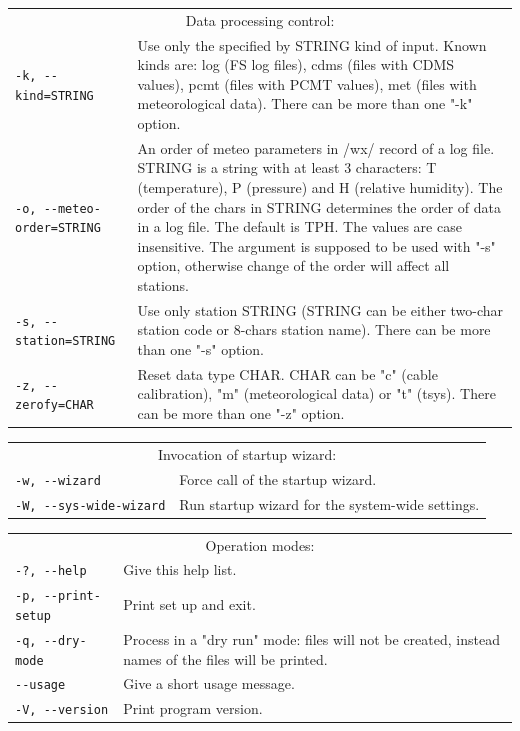 \documentclass [10pt,letterpaper]{report}
\begin{document}
\begin{tabular}{p{\leftSp}p{\riteSp}}
\multicolumn{2}{c}{Data processing control:}\\
{\tt -k, -{}-kind=STRING}       & Use only the specified by STRING kind of input. Known kinds
   are: log (FS log files), cdms (files with CDMS values), pcmt (files with PCMT values),
   met (files with meteorological data). There can be more than one "-k" option.\\
{\tt -o, -{}-meteo-order=STRING}&
   An order of meteo parameters in /wx/ record of a log file. STRING is a string with at
   least 3 characters: T (temperature), P (pressure) and H (relative humidity). The order
   of the chars in STRING determines the order of data in a log file. The default is TPH.
   The values are case insensitive. The argument is supposed to be used with "-s" option,
   otherwise change of the order will affect all stations.\\
{\tt -s, -{}-station=STRING}    & Use only station STRING (STRING can be either two-char
   station code or 8-chars station name). There can be more than one "-s" option.\\
{\tt -z, -{}-zerofy=CHAR}       & Reset data type CHAR. CHAR can be "c" (cable 
  calibration), "m" (meteorological data) or "t" (tsys). There can be more than one 
  "-z" option.\\
\end{tabular}
\vspace{5mm}

\begin{tabular}{p{\leftSp}p{\riteSp}}
\multicolumn{2}{c}{Invocation of startup wizard:}\\
{\tt -w, -{}-wizard}            & Force call of the startup wizard.\\
{\tt -W, -{}-sys-wide-wizard}   & Run startup wizard for the system-wide settings.\\
\end{tabular}
\vspace{5mm}

\begin{tabular}{p{\leftSp}p{\riteSp}}
\multicolumn{2}{c}{Operation modes:}\\
{\tt -?, -{}-help}              & Give this help list.\\
{\tt -p, -{}-print-setup}       & Print set up and exit.\\
{\tt -q, -{}-dry-mode}          & Process in a "dry run" mode: files will not be created, instead names of the files will be printed.\\
{\tt     -{}-usage}             & Give a short usage message.\\
{\tt -V, -{}-version}           & Print program version.\\
\end{tabular}
\vspace{5mm}
\end{document}
